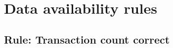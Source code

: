 \documentclass[../midgard.tex]{subfiles}
\begin{document}
\section{Data availability rules}
\label{h:data-availability-rules}

\subsection{Rule: Transaction count correct}


\end{document}
